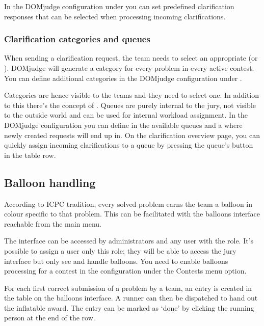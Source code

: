 \documentclass[a4paper,10pt,english,openany]{sphinxmanual}
\begin{document}
\sphinxAtStartPar
In the DOMjudge configuration under  you can set predefined
clarification responses that can be selected when processing incoming
clarifications.


\subsubsection{Clarification categories and queues}
\label{\detokenize{running:clarification-categories-and-queues}}
\sphinxAtStartPar
When sending a clarification request, the team needs to select an
appropriate  (or ). DOMjudge will generate a category
for every problem in every active contest. You can define additional
categories in the DOMjudge configuration under .

\sphinxAtStartPar
Categories are hence visible to the teams and they need to select one.
In addition to this there’s the concept of . Queues are purely
internal to the jury, not visible to the outside world and can be used
for internal workload assignment. In the DOMjudge configuration you can
define in  the available queues and a
 where newly created requests will end up in.
On the clarification overview page, you can quickly assign incoming
clarifications to a queue by pressing the queue’s button in the table row.


\subsection{Balloon handling}
\label{\detokenize{running:balloon-handling}}\label{\detokenize{running:balloons}}
\sphinxAtStartPar
According to ICPC tradition, every solved problem earns the team a
balloon in colour specific to that problem. This can be facilitated
with the balloons interface reachable from the main menu.

\sphinxAtStartPar
The interface can be accessed by administrators and any user with
the  role. It’s possible to assign a user only this
role; they will be able to access the jury interface but only see
and handle balloons. You need to enable balloons processing for a
contest in the configuration under the Contests menu option.

\sphinxAtStartPar
For each first correct submission of a problem by a team, an entry
is created in the table on the balloons interface. A runner can then
be dispatched to hand out the inflatable award. The entry can be
marked as ‘done’ by clicking the running person at the end of the row.
\end{document}

